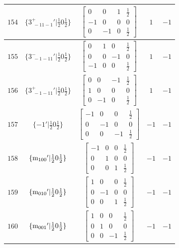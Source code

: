 \documentclass[fleqn,8pt]{jsarticle}
\begin{document}
\begin{longtable}{ccccc}
$ 154 $ & $ \{3^{+}_{\,\,-11-1}{}'|\frac{1}{2} 0 \frac{1}{2}\} $ & $ \begin{bmatrix} 0 & 0 & 1 & \frac{1}{2} \\ -1 & 0 & 0 & 0 \\ 0 & -1 & 0 & \frac{1}{2} \end{bmatrix} $ & $ 1 $ & $ -1 $ \\ \hline
$ 155 $ & $ \{3^{-}_{\,\,-1-11}{}'|\frac{1}{2} 0 \frac{1}{2}\} $ & $ \begin{bmatrix} 0 & 1 & 0 & \frac{1}{2} \\ 0 & 0 & -1 & 0 \\ -1 & 0 & 0 & \frac{1}{2} \end{bmatrix} $ & $ 1 $ & $ -1 $ \\ \hline
$ 156 $ & $ \{3^{+}_{\,\,-1-11}{}'|\frac{1}{2} 0 \frac{1}{2}\} $ & $ \begin{bmatrix} 0 & 0 & -1 & \frac{1}{2} \\ 1 & 0 & 0 & 0 \\ 0 & -1 & 0 & \frac{1}{2} \end{bmatrix} $ & $ 1 $ & $ -1 $ \\ \hline
$ 157 $ & $ \{-1{}'|\frac{1}{2} 0 \frac{1}{2}\} $ & $ \begin{bmatrix} -1 & 0 & 0 & \frac{1}{2} \\ 0 & -1 & 0 & 0 \\ 0 & 0 & -1 & \frac{1}{2} \end{bmatrix} $ & $ -1 $ & $ -1 $ \\ \hline
$ 158 $ & $ \{{\rm m}_{100}{}'|\frac{1}{2} 0 \frac{1}{2}\} $ & $ \begin{bmatrix} -1 & 0 & 0 & \frac{1}{2} \\ 0 & 1 & 0 & 0 \\ 0 & 0 & 1 & \frac{1}{2} \end{bmatrix} $ & $ -1 $ & $ -1 $ \\ \hline
$ 159 $ & $ \{{\rm m}_{010}{}'|\frac{1}{2} 0 \frac{1}{2}\} $ & $ \begin{bmatrix} 1 & 0 & 0 & \frac{1}{2} \\ 0 & -1 & 0 & 0 \\ 0 & 0 & 1 & \frac{1}{2} \end{bmatrix} $ & $ -1 $ & $ -1 $ \\ \hline
$ 160 $ & $ \{{\rm m}_{001}{}'|\frac{1}{2} 0 \frac{1}{2}\} $ & $ \begin{bmatrix} 1 & 0 & 0 & \frac{1}{2} \\ 0 & 1 & 0 & 0 \\ 0 & 0 & -1 & \frac{1}{2} \end{bmatrix} $ & $ -1 $ & $ -1 $ \\ \hline

\end{longtable}
\end{document}
